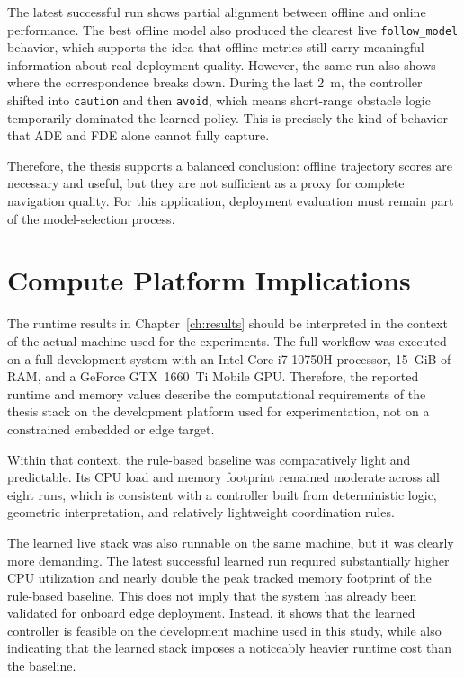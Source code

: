 The latest successful run shows partial alignment between offline and online performance. The best offline model also produced the clearest live \texttt{follow\_model} behavior, which supports the idea that offline metrics still carry meaningful information about real deployment quality. However, the same run also shows where the correspondence breaks down. During the last 2~m, the controller shifted into \texttt{caution} and then \texttt{avoid}, which means short-range obstacle logic temporarily dominated the learned policy. This is precisely the kind of behavior that ADE and FDE alone cannot fully capture.

Therefore, the thesis supports a balanced conclusion: offline trajectory scores are necessary and useful, but they are not sufficient as a proxy for complete navigation quality. For this application, deployment evaluation must remain part of the model-selection process.

\section{Compute Platform Implications}

The runtime results in Chapter~\ref{ch:results} should be interpreted in the context of the actual machine used for the experiments. The full workflow was executed on a full development system with an Intel Core i7-10750H processor, 15~GiB of RAM, and a GeForce GTX~1660~Ti Mobile GPU. Therefore, the reported runtime and memory values describe the computational requirements of the thesis stack on the development platform used for experimentation, not on a constrained embedded or edge target.

Within that context, the rule-based baseline was comparatively light and predictable. Its CPU load and memory footprint remained moderate across all eight runs, which is consistent with a controller built from deterministic logic, geometric interpretation, and relatively lightweight coordination rules.

The learned live stack was also runnable on the same machine, but it was clearly more demanding. The latest successful learned run required substantially higher CPU utilization and nearly double the peak tracked memory footprint of the rule-based baseline. This does not imply that the system has already been validated for onboard edge deployment. Instead, it shows that the learned controller is feasible on the development machine used in this study, while also indicating that the learned stack imposes a noticeably heavier runtime cost than the baseline.

